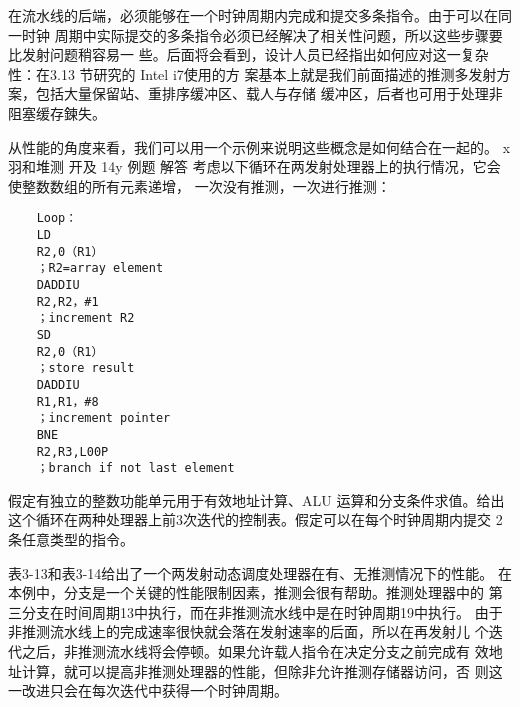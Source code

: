 在流水线的后端，必须能够在一个时钟周期内完成和提交多条指令。由于可以在同一时钟
周期中实际提交的多条指令必须已经解决了相关性问题，所以这些步骤要比发射问题稍容易一
些。后面将会看到，设计人员已经指出如何应对这一复杂性：在3.13 节研究的 Intel i7使用的方
案基本上就是我们前面描述的推测多发射方案，包括大量保留站、重排序缓冲区、载人与存储
缓冲区，后者也可用于处理非阻塞缓存鍊失。

从性能的角度来看，我们可以用一个示例来说明这些概念是如何结合在一起的。
x
羽和堆测 开及
14y
例题
解答
考虑以下循环在两发射处理器上的执行情况，它会使整数数组的所有元素递增，
一次没有推测，一次进行推测：
\begin{verbatim}
    Loop：
    LD
    R2,0（R1）
    ；R2=array element
    DADDIU
    R2,R2，#1
    ；increment R2
    SD
    R2,0（R1）
    ；store result
    DADDIU
    R1,R1，#8
    ；increment pointer
    BNE
    R2,R3,L00P
    ；branch if not last element
\end{verbatim}
假定有独立的整数功能单元用于有效地址计算、ALU 运算和分支条件求值。给出
这个循环在两种处理器上前3次迭代的控制表。假定可以在每个时钟周期内提交
2条任意类型的指令。

表3-13和表3-14给出了一个两发射动态调度处理器在有、无推测情况下的性能。
在本例中，分支是一个关键的性能限制因素，推测会很有帮助。推测处理器中的
第三分支在时间周期13中执行，而在非推测流水线中是在时钟周期19中执行。
由于非推测流水线上的完成速率很快就会落在发射速率的后面，所以在再发射儿
个迭代之后，非推测流水线将会停顿。如果允许载人指令在决定分支之前完成有
效地址计算，就可以提高非推测处理器的性能，但除非允许推测存储器访问，否
则这一改进只会在每次迭代中获得一个时钟周期。

